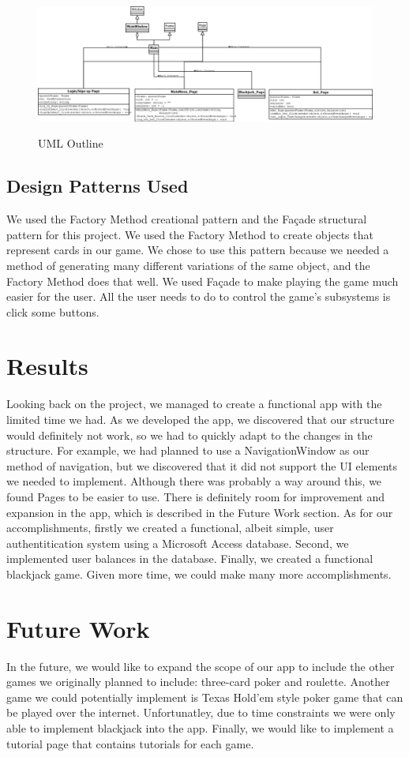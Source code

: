 \documentclass[10pt,conference,onecolumn,compsoc]{IEEEtran}
\begin{document}
\begin{figure}[h]
\caption{UML Outline}
\centering
\includegraphics[scale=0.33]{whole}
\label{fig:outline1}
\centering
\end{figure}



\subsection{Design Patterns Used}
We used the Factory Method creational pattern and the Façade structural pattern for this project. We used the Factory Method to create objects that represent cards in our game. We chose to use this pattern because we needed a method of generating many different variations of the same object, and the Factory Method does that well. We used Façade to make playing the game much easier for the user. All the user needs to do  to control the game's subsystems is click some buttons.

\section{Results}
Looking back on the project, we managed to create a functional app with the limited time we had. As we developed the app, we discovered that our structure would definitely not work, so we had to quickly adapt to the changes in the structure. For example, we had planned to use a NavigationWindow as our method of navigation, but we discovered that it did not support the UI elements we needed to implement. Although there was probably a way around this, we found Pages to be easier to use. There is definitely room for improvement and expansion in the app, which is described in the Future Work section. As for our accomplishments, firstly we created a functional, albeit simple, user authentitication system using a Microsoft Access database. Second, we implemented user balances in the database. Finally, we created a functional blackjack game. Given more time, we could make many more accomplishments.


\section{Future Work}
In the future, we would like to expand the scope of our app to include the other games we originally planned to include: three-card poker and roulette. Another game we could potentially implement is  Texas Hold'em style poker game that can be played over the internet. Unfortunatley, due to time constraints we were only able to implement blackjack into the app. Finally, we would like to implement a tutorial page that contains tutorials for each game. 
\end{document}
